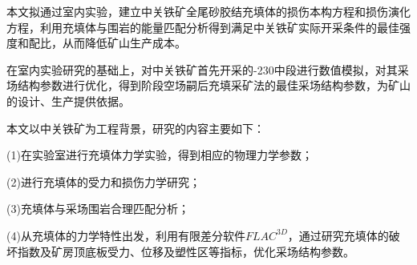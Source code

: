\xiaosi
本文拟通过室内实验，建立中关铁矿全尾砂胶结充填体的损伤本构方程和损伤演化方程，利用充填体与围岩的能量匹配分析得到满足中关铁矿实际开采条件的最佳强度和配比，从而降低矿山生产成本。

在室内实验研究的基础上，对中关铁矿首先开采的-230中段进行数值模拟，对其采场结构参数进行优化，得到阶段空场嗣后充填采矿法的最佳采场结构参数，为矿山的设计、生产提供依据。

本文以中关铁矿为工程背景，研究的内容主要如下：

(1)在实验室进行充填体力学实验，得到相应的物理力学参数；

(2)进行充填体的受力和损伤力学研究；

(3)充填体与采场围岩合理匹配分析；

(4)从充填体的力学特性出发，利用有限差分软件$FLAC^{3D}$，通过研究充填体的破坏指数及矿房顶底板受力、位移及塑性区等指标，优化采场结构参数。